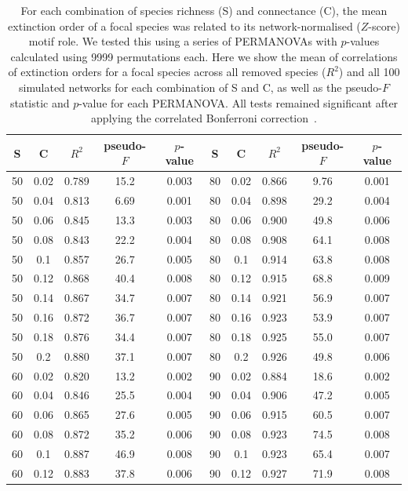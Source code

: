\documentclass[12pt]{article}
\begin{document}
		\begin{table}[hb!]
			\caption{For each combination of species richness (S) and connectance (C), the mean extinction order of a focal species was related to its network-normalised ($Z$-score) motif role. We tested this using a series of PERMANOVAs with $p$-values calculated using 9999 permutations each. Here we show the mean of correlations of extinction orders for a focal species across all removed species ($R^2$) and all 100 simulated networks for each combination of S and C, as well as the pseudo-$F$ statistic and $p$-value for each PERMANOVA. All tests remained significant after applying the correlated Bonferroni correction~\citep{Drezner2016}.}
			\label{permtable_Z}
			\begin{tabular}{c c | c | c c ||c c | c | c c |}
				S	&	C	&	$R^2$	&	pseudo-$F$	&	$p$-value	&	S	&	C &	$R^2$	&	pseudo-$F$	&	$p$-value\\ 
				\hline
                50&0.02&0.789&15.2&0.003	&	80&0.02&0.866&9.76&0.001\\
                50&0.04&0.813&6.69&0.001	&	80&0.04&0.898&29.2&0.004\\
                50&0.06&0.845&13.3&0.003	&	80&0.06&0.900&49.8&0.006\\
                50&0.08&0.843&22.2&0.004	&	80&0.08&0.908&64.1&0.008\\
                50&0.1&0.857&26.7&0.005	&	80&0.1&0.914&63.8&0.008\\
                50&0.12&0.868&40.4&0.008	&	80&0.12&0.915&68.8&0.009\\
                50&0.14&0.867&34.7&0.007	&	80&0.14&0.921&56.9&0.007\\
                50&0.16&0.872&36.7&0.007	&	80&0.16&0.923&53.9&0.007\\
                50&0.18&0.876&34.4&0.007	&	80&0.18&0.925&55.0&0.007\\
                50&0.2&0.880&37.1&0.007	&	80&0.2&0.926&49.8&0.006\\
                60&0.02&0.820&13.2&0.002	&	90&0.02&0.884&18.6&0.002\\
                60&0.04&0.846&25.5&0.004	&	90&0.04&0.906&47.2&0.005\\
                60&0.06&0.865&27.6&0.005	&	90&0.06&0.915&60.5&0.007\\
                60&0.08&0.872&35.2&0.006	&	90&0.08&0.923&74.5&0.008\\
                60&0.1&0.887&46.9&0.008	&	90&0.1&0.923&65.4&0.007\\
                60&0.12&0.883&37.8&0.006	&	90&0.12&0.927&71.9&0.008\\

\end{tabular}
\end{table}
\end{document}
